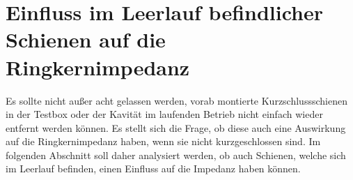 \section{Einfluss im Leerlauf befindlicher Schienen auf die Ringkernimpedanz}
Es sollte nicht au\ss{}er acht gelassen werden, vorab montierte Kurzschlussschienen in der Testbox oder der Kavit\"at im laufenden Betrieb nicht einfach wieder entfernt werden k\"onnen. Es stellt sich die Frage, ob diese auch eine Auswirkung auf die Ringkernimpedanz haben, wenn sie nicht kurzgeschlossen sind. Im folgenden Abschnitt soll daher analysiert werden, ob auch Schienen, welche sich im Leerlauf befinden, einen Einfluss auf die Impedanz haben k\"onnen.